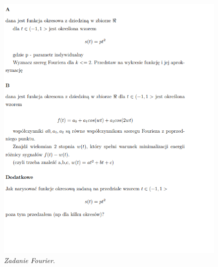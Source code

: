 \documentclass[12pt,oneside,a4paper]{book} %
\begin{document}
\begin{figure}[h]
\begin{center} 
\includegraphics[scale=0.9]{./images/ZadanieSyganly.PNG} 
\caption{\textit{Zadanie Fourier}.\newline }
\label{rys:logoup}
\end{center}
\end{figure}





\end{document}
